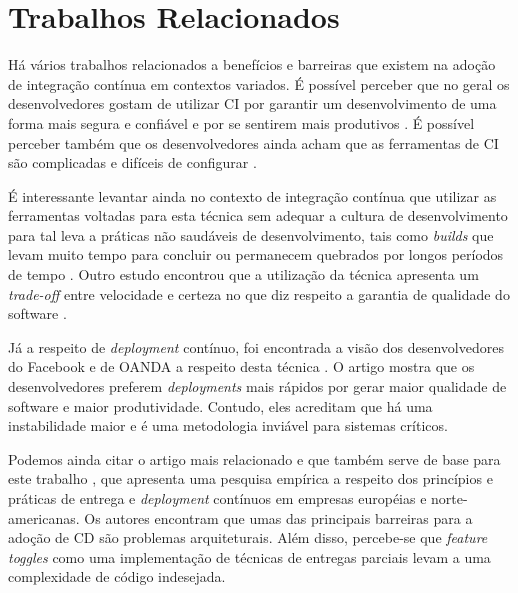 \section{Trabalhos Relacionados}

Há vários trabalhos relacionados a benefícios e barreiras que existem na adoção de integração contínua em contextos variados. É possível perceber que no geral os desenvolvedores gostam de utilizar CI por garantir um desenvolvimento de uma forma mais segura e confiável \cite{googleCi} e por se sentirem mais produtivos \cite{hilton2016}. É possível perceber também que os desenvolvedores ainda acham que as ferramentas de CI são complicadas e difíceis de configurar \cite{hilton2016}. 

É interessante levantar ainda no contexto de integração contínua que utilizar as ferramentas voltadas para esta técnica sem adequar a cultura de desenvolvimento para tal leva a práticas não saudáveis de desenvolvimento, tais como \emph{builds} que levam muito tempo para concluir ou permanecem quebrados por longos períodos de tempo  \cite{citheater2019}. Outro estudo encontrou que a utilização da técnica apresenta um \emph{trade-off} entre velocidade e certeza no que diz respeito a garantia de qualidade do software \cite{hilton2016}.

Já a respeito de \emph{deployment} contínuo, foi encontrada a visão dos desenvolvedores do Facebook e de OANDA a respeito desta técnica \cite{savor2015}. O artigo mostra que os desenvolvedores preferem \emph{deployments} mais rápidos por gerar maior qualidade de software e maior produtividade. Contudo, eles acreditam que há uma instabilidade maior e é uma metodologia inviável para sistemas críticos.

Podemos ainda citar o artigo mais relacionado e que também serve de base para este trabalho \cite{empiricalStudy2016}, que apresenta uma pesquisa empírica a respeito dos princípios e práticas de entrega e \emph{deployment} contínuos em empresas européias e norte-americanas. Os autores encontram que umas das principais barreiras para a adoção de CD são problemas arquiteturais. Além disso, percebe-se que \emph{feature toggles} como uma implementação de técnicas de entregas parciais levam a uma complexidade de código indesejada.
